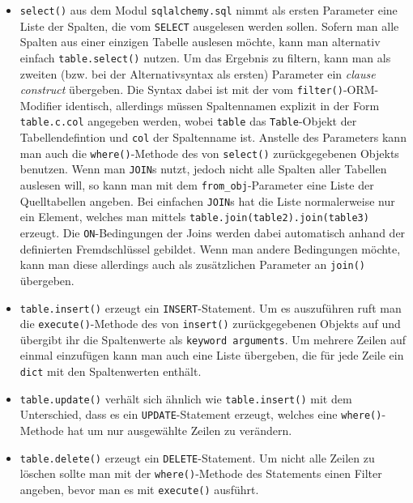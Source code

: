 \begin{itemize}

\item \texttt{select()} aus dem Modul \texttt{sqlalchemy.sql} nimmt als ersten
Parameter eine Liste der Spalten, die vom \texttt{SELECT} ausgelesen werden
sollen. Sofern man alle Spalten aus einer einzigen Tabelle auslesen möchte, kann
man alternativ einfach \texttt{table.select()} nutzen.
Um das Ergebnis zu filtern, kann man als zweiten (bzw. bei der Alternativsyntax
als ersten) Parameter ein \emph{clause construct} übergeben. Die Syntax dabei
ist mit der vom \texttt{filter()}-ORM-Modifier identisch, allerdings müssen
Spaltennamen explizit in der Form \texttt{table.c.col} angegeben werden, wobei
\texttt{table} das \texttt{Table}-Objekt der Tabellendefintion und \texttt{col}
der Spaltenname ist. Anstelle des Parameters kann man auch die
\texttt{where()}-Methode des von \texttt{select()} zurückgegebenen Objekts
benutzen. Wenn man \texttt{JOIN}s nutzt, jedoch nicht alle Spalten aller
Tabellen auslesen will, so kann man mit dem \texttt{from\_obj}-Parameter eine
Liste der Quelltabellen angeben. Bei einfachen \texttt{JOIN}s hat die Liste
normalerweise nur ein Element, welches man mittels
\texttt{table.join(table2).join(table3)} erzeugt. Die \texttt{ON}-Bedingungen
der Joins werden dabei automatisch anhand der definierten Fremdschlüssel
gebildet. Wenn man andere Bedingungen möchte, kann man diese allerdings auch als
zusätzlichen Parameter an \texttt{join()} übergeben.

\item \texttt{table.insert()} erzeugt ein \texttt{INSERT}-Statement. Um es
auszuführen ruft man die \texttt{execute()}-Methode des von \texttt{insert()}
zurückgegebenen Objekts auf und übergibt ihr die Spaltenwerte als
\texttt{keyword arguments}. Um mehrere Zeilen auf einmal einzufügen kann man
auch eine Liste übergeben, die für jede Zeile ein \texttt{dict} mit den
Spaltenwerten enthält.

\item \texttt{table.update()} verhält sich ähnlich wie \texttt{table.insert()}
mit dem Unterschied, dass es ein \texttt{UPDATE}-Statement erzeugt, welches eine
\texttt{where()}-Methode hat um nur ausgewählte Zeilen zu verändern.

\item \texttt{table.delete()} erzeugt ein \texttt{DELETE}-Statement. Um nicht
alle Zeilen zu löschen sollte man mit der \texttt{where()}-Methode des
Statements einen Filter angeben, bevor man es mit \texttt{execute()} ausführt.
\end{itemize}

